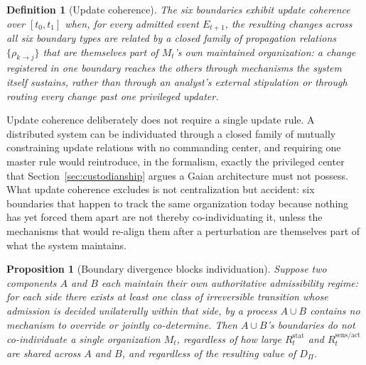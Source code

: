 \documentclass[11pt]{article}
\newtheorem{definition}{Definition}
\newtheorem{proposition}{Proposition}
\begin{document}
\begin{definition}[Update coherence]
The six boundaries exhibit \emph{update coherence} over $[t_0,t_1]$ when, for every admitted event $E_{t+1}$, the resulting changes across all six boundary types are related by a closed family of propagation relations $\{\rho_{k\to j}\}$ that are themselves part of $M_t$'s own maintained organization: a change registered in one boundary reaches the others through mechanisms the system itself sustains, rather than through an analyst's external stipulation or through routing every change past one privileged updater.
\end{definition}

Update coherence deliberately does not require a single update rule. A distributed system can be individuated through a closed family of mutually constraining update relations with no commanding center, and requiring one master rule would reintroduce, in the formalism, exactly the privileged center that Section~\ref{sec:custodianship} argues a Gaian architecture must not possess. What update coherence excludes is not centralization but accident: six boundaries that happen to track the same organization today because nothing has yet forced them apart are not thereby co-individuating it, unless the mechanisms that would re-align them after a perturbation are themselves part of what the system maintains.

\begin{proposition}[Boundary divergence blocks individuation]
\label{prop:federation}
Suppose two components $A$ and $B$ each maintain their own authoritative admissibility regime: for each side there exists at least one class of irreversible transition whose admission is decided unilaterally within that side, by a process $A\cup B$ contains no mechanism to override or jointly co-determine. Then $A\cup B$'s boundaries do not co-individuate a single organization $M_t$, regardless of how large $R^{\mathrm{stat}}_t$ and $R^{\mathrm{sens/act}}_t$ are shared across $A$ and $B$, and regardless of the resulting value of $D_\Pi$.
\end{proposition}
\end{document}
